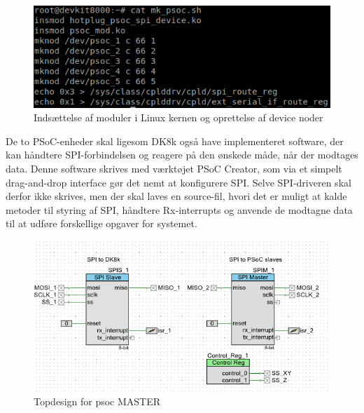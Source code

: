 \begin{figure}[H]
\includegraphics[scale=0.9]{Screenshots/Devkit_cat_mk_psoc}
\caption{Indsættelse af moduler i Linux kernen og oprettelse af device noder}
\end{figure}

De to PSoC-enheder skal ligesom DK8k også have implementeret software, der kan håndtere SPI-forbindelsen og reagere
på den ønskede måde, når der modtages data. Denne software skrives med værktøjet PSoC Creator, som via et simpelt drag-and-drop interface gør det
nemt at konfigurere SPI. Selve SPI-driveren skal derfor ikke skrives, men der skal laves en source-fil, hvori det er muligt at kalde metoder til
styring af SPI, håndtere Rx-interrupts og anvende de modtagne data til at udføre forskellige opgaver for systemet.

\begin{figure}[H]
\includegraphics[scale=0.8]{Screenshots/PSOC_opstilling_spi}
\caption{Topdesign for psoc MASTER}
\end{figure}

